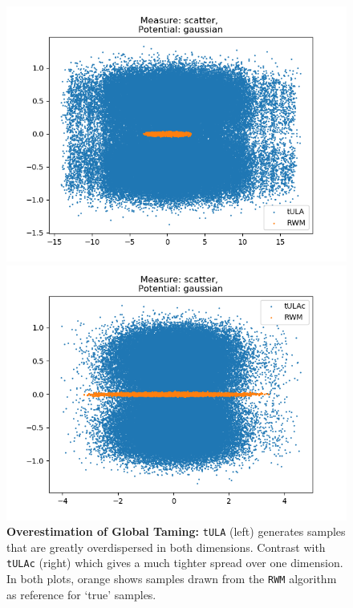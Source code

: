 \begin{figure}[H]
\centering
  \begin{minipage}[b]{0.49\textwidth}
  \centering
    \includegraphics[width=\textwidth]{Figures/ic_gaussian_tula.png}
  \end{minipage} %
  \begin{minipage}[b]{0.49\textwidth}
  \centering
    \includegraphics[width=\textwidth]{Figures/ic_gaussian_tulac.png}
  \end{minipage}
   \caption{\textbf{Overestimation of Global Taming:} \texttt{tULA} (left) generates samples that are greatly overdispersed in both dimensions. Contrast with \texttt{tULAc} (right) which gives a much tighter spread over one dimension. In both plots, orange shows samples drawn from the \texttt{RWM} algorithm as reference for `true' samples.}
   \label{fig:stiffULA}
\end{figure}

